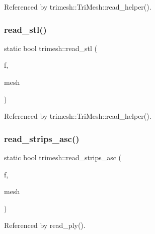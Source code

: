 Referenced by trimesh\+::\+Tri\+Mesh\+::read\+\_\+helper().

\mbox{\label{namespacetrimesh_acbe4673a2ddcbb3b2ec550b7f16b8f2c}} 
\subsubsection{\texorpdfstring{read\+\_\+stl()}{read\_stl()}}
{\footnotesize\ttfamily static bool trimesh\+::read\+\_\+stl (\begin{DoxyParamCaption}\item[{F\+I\+LE $\ast$}]{f,  }\item[{\hyperlink{classtrimesh_1_1TriMesh}{Tri\+Mesh} $\ast$}]{mesh }\end{DoxyParamCaption})\hspace{0.3cm}{\ttfamily [static]}}



Referenced by trimesh\+::\+Tri\+Mesh\+::read\+\_\+helper().

\mbox{\label{namespacetrimesh_ab480e9956963f146c83561c700c166b2}} 
\subsubsection{\texorpdfstring{read\+\_\+strips\+\_\+asc()}{read\_strips\_asc()}}
{\footnotesize\ttfamily static bool trimesh\+::read\+\_\+strips\+\_\+asc (\begin{DoxyParamCaption}\item[{F\+I\+LE $\ast$}]{f,  }\item[{\hyperlink{classtrimesh_1_1TriMesh}{Tri\+Mesh} $\ast$}]{mesh }\end{DoxyParamCaption})\hspace{0.3cm}{\ttfamily [static]}}



Referenced by read\+\_\+ply().

\mbox{\label{namespacetrimesh_acf511fb9c7857f1814d633a7f782872c}} 
